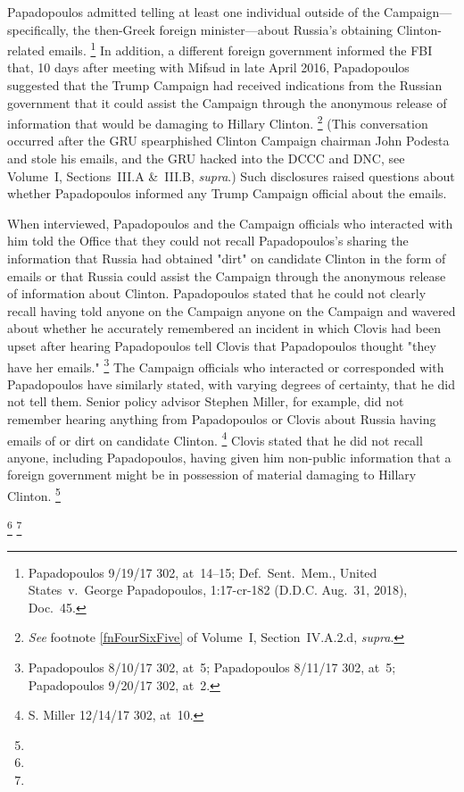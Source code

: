 Papadopoulos admitted telling at least one individual outside of the Campaign---specifically, the then-Greek foreign minister---about Russia's obtaining Clinton-related emails.%
\footnote{Papadopoulos 9/19/17 302, at~14--15;
Def.~Sent.~Mem., United States~v.\ George Papadopoulos, 1:17-cr-182 (D.D.C. Aug.~31, 2018), Doc.~45.}
In addition, a different foreign government informed the FBI that, 10 days after meeting with Mifsud in late April 2016, Papadopoulos suggested that the Trump Campaign had received indications from the Russian government that it could assist the Campaign through the anonymous release of information that would be damaging to Hillary Clinton.%
\footnote{\textit{See} footnote \ref{fnFourSixFive} of Volume~I, Section~IV.A.2.d, \textit{supra}.}
(This conversation occurred after the GRU spearphished Clinton Campaign chairman John Podesta and stole his emails, and the GRU hacked into the DCCC and DNC, see Volume~I, Sections~III.A \&~III.B, \textit{supra}.)
Such disclosures raised questions about whether Papadopoulos informed any Trump Campaign official about the emails.

When interviewed, Papadopoulos and the Campaign officials who interacted with him told the Office that they could not recall Papadopoulos's sharing the information that Russia had obtained "dirt" on candidate Clinton in the form of emails or that Russia could assist the Campaign through the anonymous release of information about Clinton.
Papadopoulos stated that he could not clearly recall having told anyone on the Campaign anyone on the Campaign and wavered about whether he accurately remembered an incident in which Clovis had been upset after hearing Papadopoulos tell Clovis that Papadopoulos thought "they have her emails."%
\footnote{Papadopoulos 8/10/17 302, at~5;
Papadopoulos 8/11/17 302, at~5;
Papadopoulos 9/20/17 302, at~2.}
The Campaign officials who interacted or corresponded with Papadopoulos have similarly stated, with varying degrees of certainty, that he did not tell them.
Senior policy advisor Stephen Miller, for example, did not remember hearing anything from Papadopoulos or Clovis about Russia having emails of or dirt on candidate Clinton.%
\footnote{S. Miller 12/14/17 302, at~10.}
Clovis stated that he did not recall anyone, including Papadopoulos, having given him non-public information that a foreign government might be in possession of material damaging to Hillary Clinton.%
\footnote{}

\footnote{}
\footnote{}

